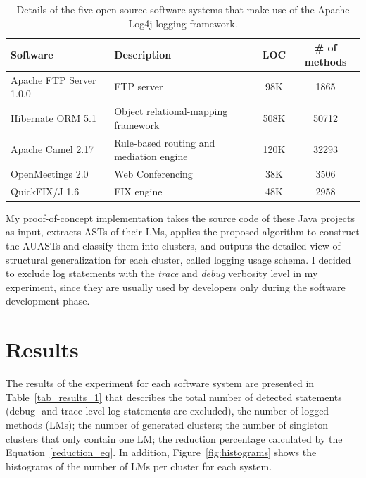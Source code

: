\begin{center}
\begin{table} [H]
\begin{center}
    \begin{tabular}{ | l | l | c | c |}
    \hline
    \textbf{Software}  & \textbf{Description}   & \textbf{LOC} & \textbf{\# of methods}  \\ \hline
    {Apache FTP Server 1.0.0} & FTP server  & 98K  & 1865 \\ \hline
{Hibernate ORM 5.1} & Object relational-mapping framework & 508K &50712   \\ \hline
    {Apache Camel 2.17} &  Rule-based routing and mediation engine  &  120K &32293 \\ \hline
{OpenMeetings 2.0} & Web Conferencing & 38K &3506 \\ \hline
    {QuickFIX/J 1.6} & FIX engine  & 48K & 2958 \\ \hline
    \end{tabular}
    \caption{Details of the five open-source software systems that make use of the {Apache Log4j} logging framework.}
\label{au2_tab1}
\end{center}
\end{table}
\end{center}

My proof-of-concept implementation takes the source code of these Java projects as input, extracts ASTs of their LMs, applies the proposed algorithm to construct the AUASTs and classify them into clusters, and outputs the detailed view of structural generalization for each cluster, called logging usage schema. I decided to exclude log statements with the \emph{trace} and \emph{debug} verbosity level in my experiment, since they are usually used by developers only during the software development phase.


\section{Results}  \label{results-characterization}
The results of the experiment for each software system are presented in Table~\ref{tab_results_1} that describes the total number of detected  statements (debug- and trace-level log statements are excluded), the number of logged methods (LMs); the number of generated clusters; the number of singleton clusters that only contain one LM; the reduction percentage calculated by the Equation~\ref{reduction_eq}. In addition, Figure~\ref{fig:histograms} shows the histograms of the number of LMs per cluster for each system.

